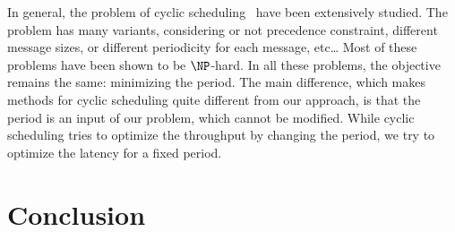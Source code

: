 In general, the problem of cyclic scheduling~\cite{levner2010complexity,hanen1993cyclic} have been extensively studied. The problem has many variants, considering or not precedence constraint, different message sizes, or different periodicity for each message, etc\dots
 Most of these problems have been shown to be $\NP$-hard. In all these problems, the objective remains the same: minimizing the period. The main difference, which makes methods for  cyclic scheduling quite different from our approach, is that the period is an input of our problem, which cannot be modified. While cyclic scheduling tries to optimize the throughput by changing the period, we try to optimize the latency for a fixed period.




\section*{Conclusion}

